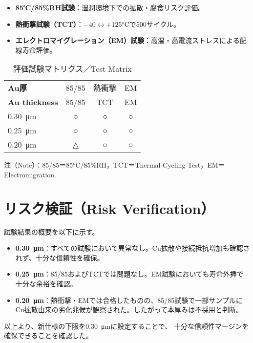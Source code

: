 \documentclass[conference]{IEEEtran}
\begin{document}
\begin{itemize}
  \item \textbf{85℃/85\%RH試験}：湿潤環境下での拡散・腐食リスク評価。
  \item \textbf{熱衝撃試験（TCT）}：$-40 \leftrightarrow +125$\si{\celsius}で500サイクル。
  \item \textbf{エレクトロマイグレーション（EM）試験}：高温・高電流ストレスによる配線寿命評価。
\end{itemize}

\begin{table}[htbp]
  \centering
  \caption{評価試験マトリクス／Test Matrix}
  \label{tab:test-matrix}
  \begin{tabular}{@{}lccc@{}}
    \toprule
    \textbf{Au厚} & 85/85 & 熱衝撃 & EM \\
    \textbf{Au thickness} & 85/85 & TCT & EM \\
    \midrule
    \SI{0.30}{\micro\meter} & ○ & ○ & ○ \\
    \SI{0.25}{\micro\meter} & ○ & ○ & ○ \\
    \SI{0.20}{\micro\meter} & △ & ○ & ○ \\
    \bottomrule
  \end{tabular}
  \vspace{2pt}
  \footnotesize{注（Note）：85/85＝85\si{\celsius}/85\%RH，TCT＝Thermal Cycling Test，EM＝Electromigration.}
\end{table}

\section{リスク検証（Risk Verification）}
試験結果の概要を以下に示す。

\begin{itemize}
  \item \textbf{\SI{0.30}{\micro\meter}}：すべての試験において異常なし。Cu拡散や接続抵抗増加も確認されず、十分な信頼性を確保。
  \item \textbf{\SI{0.25}{\micro\meter}}：85/85およびTCTでは問題なし。EM試験においても寿命外挿で十分な余裕を確認。
  \item \textbf{\SI{0.20}{\micro\meter}}：熱衝撃・EMでは合格したものの、85/85試験で一部サンプルにCu拡散由来の劣化兆候が観察された。したがって本厚みは不採用と判断。
\end{itemize}

以上より、新仕様の下限を\SI{0.30}{\micro\meter}に設定することで、
十分な信頼性マージンを確保できることを確認した。
\end{document}
